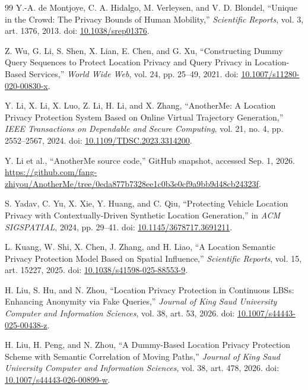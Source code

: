 \documentclass[12pt,a4paper,oneside]{report}
\begin{document}
\begin{thebibliography}{99}
Y.-A. de Montjoye, C. A. Hidalgo, M. Verleysen, and V. D. Blondel,
``Unique in the Crowd: The Privacy Bounds of Human Mobility,''
\emph{Scientific Reports}, vol. 3, art. 1376, 2013.
doi: \href{https://doi.org/10.1038/srep01376}{10.1038/srep01376}.

Z. Wu, G. Li, S. Shen, X. Lian, E. Chen, and G. Xu,
``Constructing Dummy Query Sequences to Protect Location Privacy and Query Privacy in Location-Based Services,''
\emph{World Wide Web}, vol. 24, pp. 25--49, 2021.
doi: \href{https://doi.org/10.1007/s11280-020-00830-x}{10.1007/s11280-020-00830-x}.

Y. Li, X. Li, X. Luo, Z. Li, H. Li, and X. Zhang,
``AnotherMe: A Location Privacy Protection System Based on Online Virtual Trajectory Generation,''
\emph{IEEE Transactions on Dependable and Secure Computing}, vol. 21, no. 4,
pp. 2552--2567, 2024.
doi: \href{https://doi.org/10.1109/TDSC.2023.3314200}{10.1109/TDSC.2023.3314200}.

Y. Li et al., ``AnotherMe source code,'' GitHub snapshot, accessed Sep. 1, 2026.
\url{https://github.com/fang-zhiyou/AnotherMe/tree/0eda877b7328ee1c0b3e0cf9a9bb9d48cb24323f}.

S. Yadav, C. Yu, X. Xie, Y. Huang, and C. Qiu,
``Protecting Vehicle Location Privacy with Contextually-Driven Synthetic Location Generation,''
in \emph{ACM SIGSPATIAL}, 2024, pp. 29--41.
doi: \href{https://doi.org/10.1145/3678717.3691211}{10.1145/3678717.3691211}.

L. Kuang, W. Shi, X. Chen, J. Zhang, and H. Liao,
``A Location Semantic Privacy Protection Model Based on Spatial Influence,''
\emph{Scientific Reports}, vol. 15, art. 15227, 2025.
doi: \href{https://doi.org/10.1038/s41598-025-88553-9}{10.1038/s41598-025-88553-9}.

H. Liu, S. Hu, and N. Zhou,
``Location Privacy Protection in Continuous LBSs: Enhancing Anonymity via Fake Queries,''
\emph{Journal of King Saud University Computer and Information Sciences},
vol. 38, art. 53, 2026.
doi: \href{https://doi.org/10.1007/s44443-025-00438-z}{10.1007/s44443-025-00438-z}.

H. Liu, H. Peng, and N. Zhou,
``A Dummy-Based Location Privacy Protection Scheme with Semantic Correlation of Moving Paths,''
\emph{Journal of King Saud University Computer and Information Sciences},
vol. 38, art. 478, 2026.
doi: \href{https://doi.org/10.1007/s44443-026-00899-w}{10.1007/s44443-026-00899-w}.



\end{thebibliography}
\end{document}
